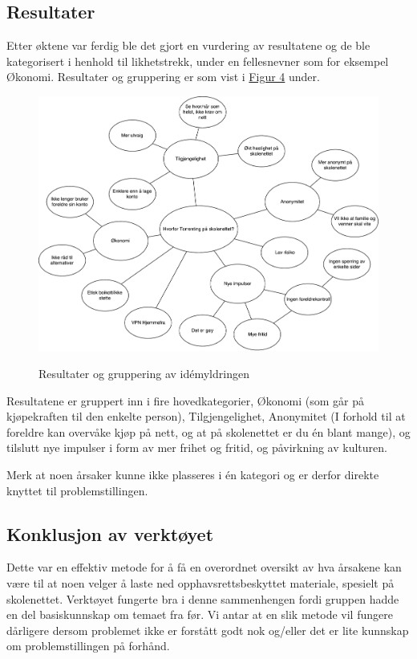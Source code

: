 \subsection{Resultater}
Etter øktene var ferdig ble det gjort en vurdering av resultatene og de ble kategorisert i henhold til likhetstrekk, under en fellesnevner som for eksempel Økonomi. Resultater og gruppering er som vist i \hyperref[fig:idemyldring]{Figur 4} under.

\begin{figure}[H]
    \centering    \includegraphics[scale=0.45]{case_1/bilder/idemyldring}
    \label{fig:idemyldring}
    \caption[Idémyldring]{Resultater og gruppering av idémyldringen}
\end{figure}

Resultatene er gruppert inn i fire hovedkategorier, Økonomi (som går på kjøpekraften til den enkelte person), Tilgjengelighet, Anonymitet (I forhold til at foreldre kan overvåke kjøp på nett, og at på skolenettet er du én blant mange), og tilslutt nye impulser i form av mer frihet og fritid, og påvirkning av kulturen.

Merk at noen årsaker kunne ikke plasseres i én kategori og er derfor direkte knyttet til problemstillingen. 


\subsection{Konklusjon av verktøyet}
Dette var en effektiv metode for å få en overordnet oversikt av hva årsakene kan være til at noen velger å laste ned opphavsrettsbeskyttet materiale, spesielt på skolenettet. Verktøyet fungerte bra i denne sammenhengen fordi gruppen hadde en del basiskunnskap om temaet fra før. Vi antar at en slik metode vil fungere dårligere dersom problemet ikke er forstått godt nok og/eller det er lite kunnskap om problemstillingen på forhånd.